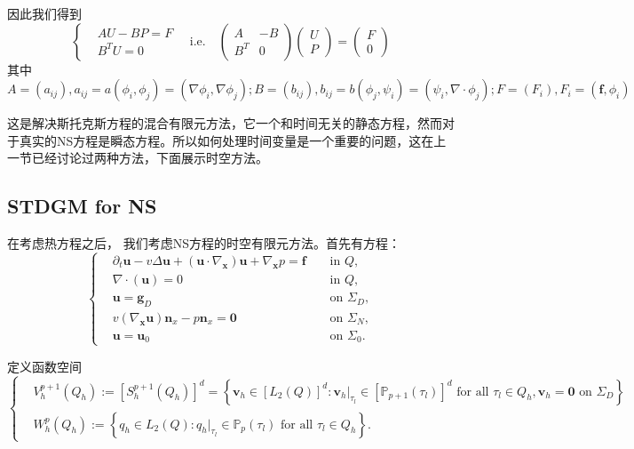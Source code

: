 因此我们得到
$$\left\{
    \begin{aligned}
        &AU-BP=F\\
        &B^TU=0
    \end{aligned}
\right.\quad\text{i.e.}\quad 
\begin{pmatrix}
    A & -B\\
    B^T & 0
\end{pmatrix}\begin{pmatrix}
    U\\P
\end{pmatrix}=\begin{pmatrix}
    F\\0
\end{pmatrix}$$
其中 $A=(a_{ij}),a_{ij}=a(\phi_i, \phi_j)=(\nabla \phi_i, \nabla \phi_j);B=(b_{ij}),b_{ij}=b(\phi_j, \psi_i)=(\psi_i, \nabla\cdot\phi_j);F=(F_i),F_i=(\textbf{f},\phi_i)$

这是解决斯托克斯方程的混合有限元方法，它一个和时间无关的静态方程，然而对于真实的NS方程是瞬态方程。所以如何处理时间变量是一个重要的问题，这在上一节已经讨论过两种方法，下面展示时空方法。


\subsection{STDGM for NS}
在考虑热方程之后， 我们考虑NS方程的时空有限元方法。首先有方程：
$$\left\{
\begin{aligned}
    &\partial_{t} \boldsymbol{u}-v \Delta \boldsymbol{u}+\left(\boldsymbol{u} \cdot \nabla_{\boldsymbol{x}}\right) \boldsymbol{u}+\nabla_{\boldsymbol{x}} p  =\boldsymbol{f} & & \text { in } Q, \\
    &\nabla \cdot(\boldsymbol{u})  =0 & & \text { in } Q, \\
    &\boldsymbol{u}  =\boldsymbol{g}_{D} & & \text { on } \Sigma_{D}, \\
    &v\left(\nabla_{\boldsymbol{x}} \boldsymbol{u}\right) \boldsymbol{n}_{x}-p \boldsymbol{n}_{x}  =\mathbf{0} & & \text { on } \Sigma_{N}, \\
    &\boldsymbol{u}  =\boldsymbol{u}_{0} & & \text { on } \Sigma_{0} .
\end{aligned}\right.$$

定义函数空间
$$\left\{\begin{aligned}
    &V_{h}^{p+1}\left(Q_h\right) :=\left[S_{h}^{p+1}\left(Q_h\right)\right]^{d} 
    =\left\{\boldsymbol{v}_{h} \in\left[L_{2}(Q)\right]^{d}: \boldsymbol{v}_h|_{\tau_{l}} \in\left[\mathbb{P}_{p+1}\left(\tau_{l}\right)\right]^{d} \text { for all } \tau_{l} \in Q_h, \boldsymbol{v}_{h}=\mathbf{0} \text { on } \Sigma_{D}\right\} \\
    &W_{h}^{p}\left(Q_h\right) :=\left\{q_{h} \in L_{2}(Q): q_h|_{\tau_{l}} \in \mathbb{P}_{p}\left(\tau_{l}\right) \text { for all } \tau_{l} \in Q_h\right\} .
\end{aligned}\right.$$


